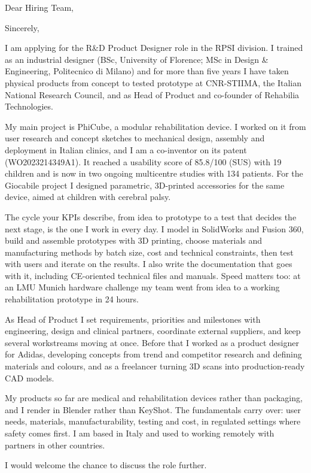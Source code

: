 \documentclass[11pt,a4paper,sans]{moderncv}
\begin{document}

\opening{Dear Hiring Team,}
\closing{Sincerely,}
\makelettertitle

I am applying for the R\&D Product Designer role in the RPSI division. I trained as an industrial designer (BSc, University of Florence; MSc in Design \& Engineering, Politecnico di Milano) and for more than five years I have taken physical products from concept to tested prototype at CNR-STIIMA, the Italian National Research Council, and as Head of Product and co-founder of Rehabilia Technologies.

My main project is PhiCube, a modular rehabilitation device. I worked on it from user research and concept sketches to mechanical design, assembly and deployment in Italian clinics, and I am a co-inventor on its patent (WO2023214349A1). It reached a usability score of 85.8/100 (SUS) with 19 children and is now in two ongoing multicentre studies with 134 patients. For the Giocabile project I designed parametric, 3D-printed accessories for the same device, aimed at children with cerebral palsy.

The cycle your KPIs describe, from idea to prototype to a test that decides the next stage, is the one I work in every day. I model in SolidWorks and Fusion 360, build and assemble prototypes with 3D printing, choose materials and manufacturing methods by batch size, cost and technical constraints, then test with users and iterate on the results. I also write the documentation that goes with it, including CE-oriented technical files and manuals. Speed matters too: at an LMU Munich hardware challenge my team went from idea to a working rehabilitation prototype in 24 hours.

As Head of Product I set requirements, priorities and milestones with engineering, design and clinical partners, coordinate external suppliers, and keep several workstreams moving at once. Before that I worked as a product designer for Adidas, developing concepts from trend and competitor research and defining materials and colours, and as a freelancer turning 3D scans into production-ready CAD models.

My products so far are medical and rehabilitation devices rather than packaging, and I render in Blender rather than KeyShot. The fundamentals carry over: user needs, materials, manufacturability, testing and cost, in regulated settings where safety comes first. I am based in Italy and used to working remotely with partners in other countries.

I would welcome the chance to discuss the role further.

\makeletterclosing
\end{document}
